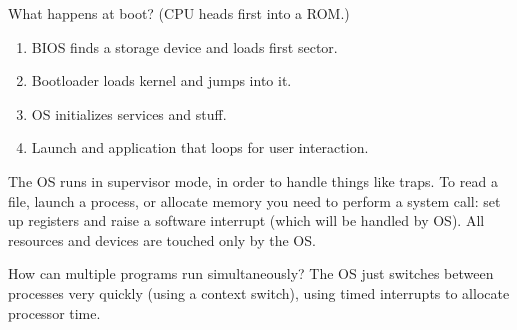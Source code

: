What happens at boot? (CPU heads first into a ROM.)
\begin{enumerate}
	\item BIOS finds a storage device and loads first sector.
	\item Bootloader loads kernel and jumps into it.
	\item OS initializes services and stuff.
	\item Launch and application that loops for user interaction.
\end{enumerate}
The OS runs in supervisor mode, in order to handle things like traps.
To read a file, launch a process, or allocate memory you need to perform a system call: set up registers and raise a software interrupt (which will be handled by OS).
All resources and devices are touched only by the OS.

How can multiple programs run simultaneously?
The OS just switches between processes very quickly (using a context switch),
using timed interrupts to allocate processor time.
